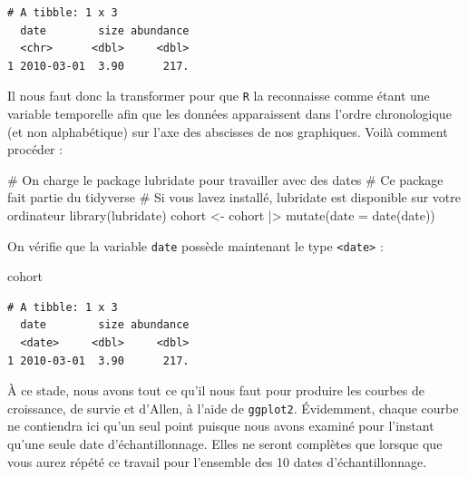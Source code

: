 \documentclass[
  french,
  a4paper,
  DIV=11,
  numbers=noendperiod,
  oneside]{scrreprt}
\newenvironment{Shaded}{}{}
\newcommand{\AttributeTok}[1]{\textcolor[rgb]{0.84,0.23,0.29}{#1}}
\newcommand{\CommentTok}[1]{\textcolor[rgb]{0.42,0.45,0.49}{#1}}
\newcommand{\FunctionTok}[1]{\textcolor[rgb]{0.44,0.26,0.76}{#1}}
\newcommand{\NormalTok}[1]{\textcolor[rgb]{0.14,0.16,0.18}{#1}}
\newcommand{\OtherTok}[1]{\textcolor[rgb]{0.44,0.26,0.76}{#1}}
\newcommand{\SpecialCharTok}[1]{\textcolor[rgb]{0.00,0.36,0.77}{#1}}
\begin{document}
\begin{tcolorbox}
\begin{verbatim}
# A tibble: 1 x 3
  date        size abundance
  <chr>      <dbl>     <dbl>
1 2010-03-01  3.90      217.
\end{verbatim}

Il nous faut donc la transformer pour que \texttt{R} la reconnaisse
comme étant une variable temporelle afin que les données apparaissent
dans l'ordre chronologique (et non alphabétique) sur l'axe des abscisses
de nos graphiques. Voilà comment procéder :

\begin{Shaded}
\begin{Highlighting}[]
\CommentTok{\# On charge le package lubridate pour travailler avec des dates}
\CommentTok{\# Ce package fait partie du tidyverse}
\CommentTok{\# Si vous l\textquotesingle{}avez installé, lubridate est disponible sur votre ordinateur}
\FunctionTok{library}\NormalTok{(lubridate)}
\NormalTok{cohort }\OtherTok{\textless{}{-}}\NormalTok{ cohort }\SpecialCharTok{|\textgreater{}}
  \FunctionTok{mutate}\NormalTok{(}\AttributeTok{date =} \FunctionTok{date}\NormalTok{(date))}
\end{Highlighting}
\end{Shaded}


On vérifie que la variable \texttt{date} possède maintenant le type
\texttt{\textless{}date\textgreater{}} :

\begin{Shaded}
\begin{Highlighting}[]
\NormalTok{cohort}
\end{Highlighting}
\end{Shaded}

\begin{verbatim}
# A tibble: 1 x 3
  date        size abundance
  <date>     <dbl>     <dbl>
1 2010-03-01  3.90      217.
\end{verbatim}

À ce stade, nous avons tout ce qu'il nous faut pour produire les courbes
de croissance, de survie et d'Allen, à l'aide de \texttt{ggplot2}.
Évidemment, chaque courbe ne contiendra ici qu'un seul point puisque
nous avons examiné pour l'instant qu'une seule date d'échantillonnage.
Elles ne seront complètes que lorsque que vous aurez répété ce travail
pour l'ensemble des 10 dates d'échantillonnage.


\end{tcolorbox}
\end{document}
